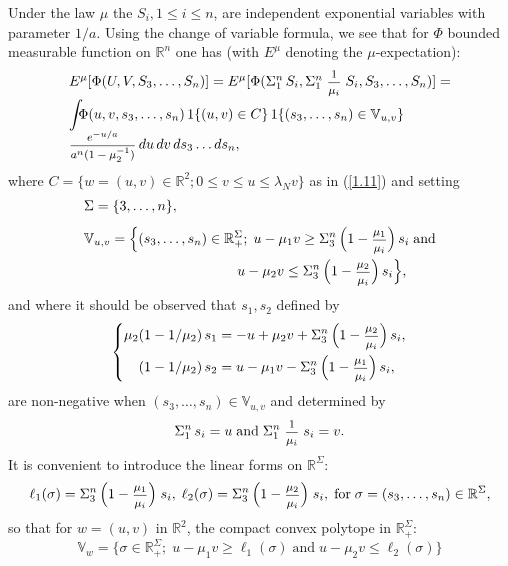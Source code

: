 \documentclass[12pt,leqno]{article}
\def\IR{{\mathbb R}}
\def\IV{{\mathbb V}}
\def\n{\noindent}
\def\dis{\displaystyle}
\def\f{\footnotesize}
\begin{document}
\begin{appendix}
\smallskip\n
Under the law $\mu$ the $S_i, 1 \le i \le n$, are independent exponential variables with parameter $1/a$. Using the change of variable formula, we see that for $\Phi$ bounded measurable function on $\IR^n$ one has (with $E^\mu$ denoting the $\mu$-expectation):
\begin{equation}\label{A.3}
\begin{array}{l}
E^\mu [ \Phi (U,V,S_3, \dots, S_n)] = E^\mu[\Phi (\Sigma^n_1\,S_i, \Sigma^n_1 \; \mbox{\f $\dis\frac{1}{\mu_i}$} \; S_i, S_3, \dots, S_n)] =
\\[1.5ex]
\dis\int \!\!\!\Phi (u,v,s_3,\dots,s_n)  \,1\{(u,v) \in C\}  \,1\{(s_3, \dots, s_n) \in \IV_{u,v}\} 
\\[1ex]
\mbox{\f $\dis\frac{e^{-u/a}}{a^n(1 - \mu_2^{-1})}$} \,du \, dv \, ds_3 \dots ds_n,
\end{array}
\end{equation}
where $C = \{w = (u,v) \in \IR^2; 0 \le v \le u \le \lambda_N v\}$ as in (\ref{1.11}) and setting
\begin{align}
& \Sigma = \{3, \dots, n\}, \label{A.4}
\\[1ex]
&\IV_{u,v} = \Big\{(s_3, \dots, s_n) \in \IR^\Sigma_+; \; u - \mu_1 v \ge \Sigma^n_3 \, \Big(1- \mbox{\f $\dis\frac{\mu_1}{\mu_i}$}\Big)\,s_i \; \mbox{and}
 \label{A.5}
\\
&\qquad \qquad \qquad\qquad  \qquad \quad u - \mu_2 v \le \Sigma^n_3 \, \Big(1-\mbox{\f $\dis\frac{\mu_2}{\mu_i}$}\Big)\,s_i\Big\}, \nonumber
\end{align}
and where it should be observed that $s_1,s_2$ defined by
\begin{equation}\label{A.6}
\left\{ \begin{split} 
\mu_2 ( 1- 1/\mu_2) \,s_1 &=  -u +\mu_2 v + \Sigma^n_3 \, \Big(1-\mbox{\f $\dis\frac{\mu_2}{\mu_i}$}\Big)\,s_i,
\\
( 1- 1/\mu_2) \,s_2 &= u - \mu_1 v - \Sigma^n_3 \, \Big(1-\mbox{\f $\dis\frac{\mu_1}{\mu_i}$}\Big)\,s_i,
\end{split} \right.
\end{equation}
are non-negative when $(s_3, \dots, s_n) \in \IV_{u,v}$ and determined by
\begin{equation}\label{A.7}
\Sigma^n_1 \, s_i = u \; \mbox{and} \; \Sigma^n_1 \; \mbox{\f $\dis\frac{1}{\mu_i}$}\;s_i = v.
\end{equation}
It is convenient to introduce the linear forms on $\IR^\Sigma$:
\begin{equation}\label{A.8}
\ell_1(\sigma) = \Sigma^n_3 \, \Big(1-\mbox{\f $\dis\frac{\mu_1}{\mu_i}$}\Big)\;s_i, \;\ell_2(\sigma) = \Sigma^n_3 \, \Big(1-\mbox{\f $\dis\frac{\mu_2}{\mu_i}$}\Big)\;s_i, \;\mbox{for} \; \sigma = (s_3, \dots, s_n) \in \IR^\Sigma,
\end{equation}
so that for $w = (u,v)$ in $\IR^2$, the compact convex polytope in $\IR_+^\Sigma$:
\begin{equation}\label{A.9}
\IV_w = \{ \sigma \in \IR^\Sigma_+; \; u - \mu_1 v \ge \ell_1 (\sigma) \; \mbox{and} \; u - \mu_2 v \le \ell_2(\sigma)\}
\end{equation}


\end{appendix}
\end{document}
